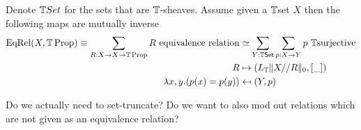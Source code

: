 \begin{lemma}{\label{lemma:quotient-by-equivalence-relation}}
	Denote $\mathbb{T} Set$ for the sets that are $\mathbb{T}$-sheaves. Assume given a $\mathbb{T}$set  $X$ then the following maps are mutually inverse
	\begin{align*}
		 \mathrm{EqRel}(X  , \mathbb{T} \operatorname{Prop}) \equiv \sum_{R:X\to X\to \mathbb{T}\operatorname{Prop}} R\ \mathrm{equivalence\ relation} &\simeq \sum_{Y:\mathbb{T} \mathrm{\operatorname{\mathsf {Set}}}} \sum_{p:X\to Y} p\ \mathbb{T}\mathrm{surjective} \\
		R &\mapsto (L_{\mathbb{T}} \| X//R \|_0,[\_]) \\
		\lambda x,y.  (p(x)=p(y)) &\mapsfrom (Y,p) 
	\end{align*}
\end{lemma}
\begin{question}
	Do we actually need to set-truncate? Do we want to also mod out relations which are not given as an equivalence relation?
\end{question}
